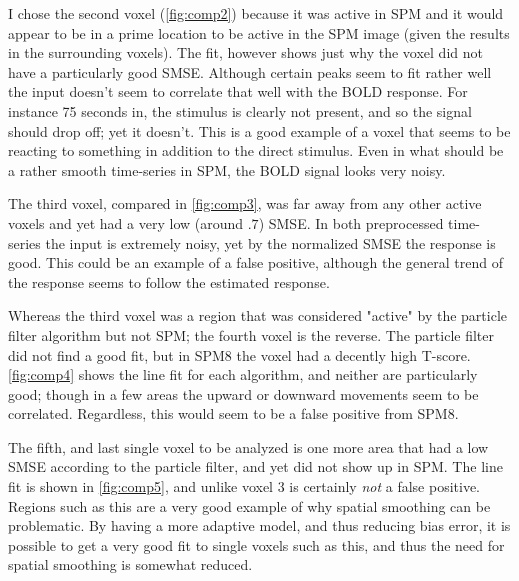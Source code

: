 I chose the second voxel (\autoref{fig:comp2}) because it was active in SPM and it would appear to be in a prime
location to be active in the SPM image (given the results in the surrounding voxels). The fit,
however shows just why the voxel did not have a particularly good SMSE. Although certain peaks 
seem to fit rather well the input doesn't seem to correlate that well with the BOLD response. For
instance 75 seconds in, the stimulus is clearly not present, and so the signal should drop off; yet
it doesn't. This is a good example of a voxel that seems to be reacting to something in addition to
the direct stimulus. Even in what should be a rather smooth time-series in SPM, the BOLD signal
looks very noisy. 

The third voxel, compared in \autoref{fig:comp3}, was far away from any other active voxels 
and yet had a very low (around $.7$) SMSE.
In both preprocessed time-series the input is extremely noisy, yet by the normalized SMSE
the response is good. This could be an example of a false positive, although the general trend
of the response seems to follow the estimated response. 

Whereas the third voxel was a region that was considered "active" by the particle filter
algorithm but not SPM; the fourth voxel is the reverse. The particle filter did not
find a good fit, but in SPM8 the voxel had a decently high T-score. \autoref{fig:comp4} shows
the line fit for each algorithm, and neither are particularly good; though in a few areas
the upward or downward movements seem to be correlated. Regardless, this would seem to be
a false positive from SPM8. 

The fifth, and last single voxel to be analyzed is one more area that had a low SMSE according
to the particle filter, and yet did not show up in SPM. The line fit is shown in \autoref{fig:comp5},
and unlike voxel 3 is certainly \emph{not} a false positive. Regions such as this are a very 
good example of why spatial smoothing can be problematic. By having a more adaptive model, and
thus reducing bias error, it is possible to get a very good fit to single voxels such as this,
and thus the need for spatial smoothing is somewhat reduced. 

